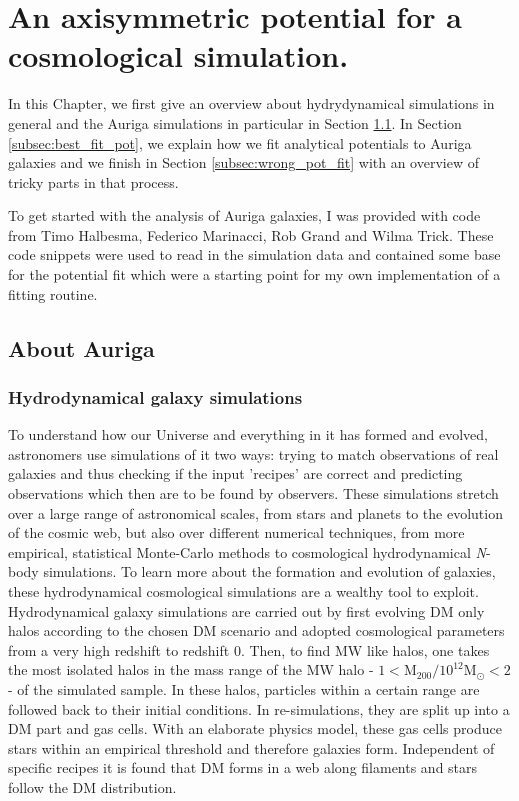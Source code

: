 \section{An axisymmetric potential for a cosmological simulation.}\label{sec:Auriga}
In this Chapter, we first give an overview about hydrydynamical simulations in general and the Auriga simulations in particular in Section \ref{subsec:auriga}. In Section \ref{subsec:best_fit_pot}, we explain how we fit analytical potentials to Auriga galaxies and we finish in Section \ref{subsec:wrong_pot_fit} with an overview of tricky parts in that process.

To get started with the analysis of Auriga galaxies, I was provided with code from Timo Halbesma, Federico Marinacci, Rob Grand and Wilma Trick. These code snippets were used to read in the simulation data and contained some base for the potential fit which were a starting point for my own implementation of a fitting routine. 

\subsection{About Auriga}\label{subsec:auriga}
\subsubsection{Hydrodynamical galaxy simulations}\label{subsubsec:hydro_sim}
To understand how our Universe and everything in it has formed and evolved, astronomers use simulations of it two ways: trying to match observations of real galaxies and thus checking if the input 'recipes' are correct and predicting observations which then are to be found by observers. These simulations stretch over a large range of astronomical scales, from stars and planets to the evolution of the cosmic web, but also over different numerical techniques, from more empirical, statistical Monte-Carlo methods to cosmological hydrodynamical \textit{N}-body simulations. To learn more about the formation and evolution of galaxies, these hydrodynamical cosmological simulations are a wealthy tool to exploit. 
\\Hydrodynamical galaxy simulations are carried out by first evolving \ac{DM} only halos according to the chosen \ac{DM} scenario and adopted cosmological parameters from a very high redshift to redshift 0. Then, to find \ac{MW} like halos, one takes the most isolated halos in the mass range of the \ac{MW} halo - $1 < \mathrm{M}_{200} / 10^12 \mathrm{M}_\odot < 2$ - of the simulated sample. In these halos, particles within a certain range are followed back to their initial conditions. In re-simulations, they are split up into a \ac{DM} part and gas cells. With an elaborate physics model, these gas cells produce stars within an empirical threshold and therefore galaxies form. Independent of specific recipes it is found that \ac{DM} forms in a web along filaments and stars follow the \ac{DM} distribution. 


